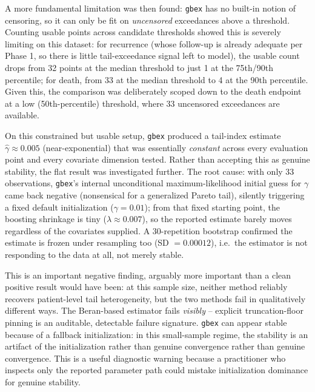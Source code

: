 \documentclass[11pt]{article}
\begin{document}
A more fundamental limitation was then found: \texttt{gbex} has no built-in notion
of censoring, so it can only be fit on \emph{uncensored} exceedances above a
threshold. Counting usable points across candidate thresholds showed this is
severely limiting on this dataset: for recurrence (whose follow-up is already
adequate per Phase 1, so there is little tail-exceedance signal left to model), the
usable count drops from 32 points at the median threshold to just 1 at the 75th/90th
percentile; for death, from 33 at the median threshold to 4 at the 90th percentile.
Given this, the comparison was deliberately scoped down to the death endpoint at a
low (50th-percentile) threshold, where 33 uncensored exceedances are available.

On this constrained but usable setup, \texttt{gbex} produced a tail-index estimate
$\hat\gamma \approx 0.005$ (near-exponential) that was essentially \emph{constant}
across every evaluation point and every covariate dimension tested. Rather than
accepting this as genuine stability, the flat result was investigated further. The
root cause: with only 33 observations, \texttt{gbex}'s internal unconditional
maximum-likelihood initial guess for $\gamma$ came back negative (nonsensical for a
generalized Pareto tail), silently triggering a fixed default initialization
($\gamma=0.01$); from that fixed starting point, the boosting shrinkage is tiny
($\lambda \approx 0.007$), so the reported estimate barely moves regardless of the
covariates supplied. A 30-repetition bootstrap confirmed the estimate is frozen
under resampling too (SD $=0.00012$), i.e.\ the estimator is not responding to the
data at all, not merely stable.

This is an important negative finding, arguably more important than a
clean positive result would have been: at this sample size, neither method
reliably recovers patient-level tail heterogeneity, but the two methods fail in
qualitatively different ways. The Beran-based estimator fails \emph{visibly} --
explicit truncation-floor pinning is an auditable, detectable failure signature.
\texttt{gbex} can appear stable because of a fallback initialization: in this small-sample
regime, the stability is an artifact of the initialization rather than genuine convergence
rather than genuine convergence. This is a useful diagnostic warning because a practitioner who inspects only the
reported parameter path could mistake initialization dominance for genuine stability.
\end{document}

